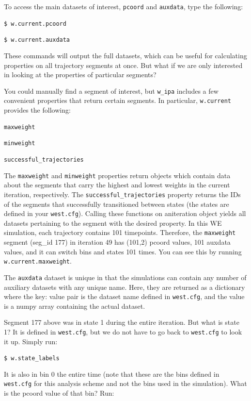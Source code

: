 \documentclass[9pt,tutorial,ASAPversion]{livecoms}
\begin{document}
To access the main datasets of interest, \verb|pcoord| and \verb|auxdata|, type the following: 

\verb|$ w.current.pcoord|

\verb|$ w.current.auxdata|

These commands will output the full datasets, which can be useful for calculating properties on all trajectory segments at once. 
But what if we are only interested in looking at the properties of particular segments?

You could manually find a segment of interest, but \verb|w_ipa| includes a few convenient properties that return certain segments. 
In particular, \verb|w.current| provides the following:

\verb|maxweight|

\verb|minweight|

\verb|successful_trajectories|

The \verb|maxweight| and \verb|minweight| properties return objects which contain data about the segments that carry the highest and lowest weights in the current iteration, respectively. 
The \verb|successful_trajectories| property returns the IDs of the segments that successfully transitioned between states  (the states are defined in your \verb|west.cfg|). 
Calling these functions on aniteration object yields all datasets pertaining to the segment with the desired property. 
In this WE simulation, each trajectory contains 101 timepoints. 
Therefore, the \verb|maxweight| segment (seg\_id 177) in iteration 49 has (101,2) pcoord values, 101 auxdata values, and it can switch bins and states 101 times. 
You can see this by running \verb|w.current.maxweight|.
 
The \verb|auxdata| dataset is unique in that the simulations can contain any number of auxiliary datasets with any unique name. 
Here, they are returned as a dictionary where the key: value pair is the dataset name defined in \verb|west.cfg|, and the value is a numpy array containing the actual dataset.

Segment 177 above was in state 1 during the entire iteration. 
But what is state 1? 
It is defined in \verb|west.cfg|, but we do not have to go back to \verb|west.cfg| to look it up. 
Simply run:

\verb|$ w.state_labels|

It is also in bin 0 the entire time (note that these are the bins defined in \verb|west.cfg| for this analysis scheme and not the bins used in the simulation). 
What is the pcoord value of that bin? Run:
\end{document}
